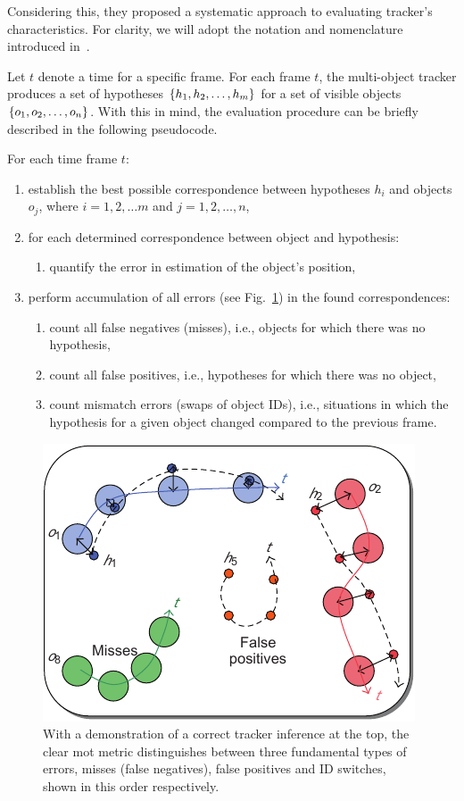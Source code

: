 Considering this, they proposed a systematic approach to evaluating tracker's characteristics. For clarity, we will adopt the notation and nomenclature introduced in~\cite{Bernardin2008}.

Let $t$ denote a time for a specific frame. For each frame $t$, the multi-object tracker produces a set of hypotheses $\left\{ {h_1, h_2, \dots, h_m} \right\}$ for a set of visible objects $\left\{ {o_1, o_2, \dots, o_n} \right\}$. With this in mind, the evaluation procedure can be briefly described in the following pseudocode.

For each time frame $t$:
\begin{enumerate}
    \item establish the best possible correspondence between hypotheses $h_i$ and objects $o_j$, where $i = 1, 2, \dots m$ and $j = 1, 2, \dots, n$,
    \item for each determined correspondence between object and hypothesis:
    \begin{enumerate}
        \item quantify the error in estimation of the object's position,
    \end{enumerate}
    \item perform accumulation of all errors (see Fig.~\ref{fig:CLEARHypotheses}) in the found correspondences:
    \begin{enumerate}
        \item count all false negatives (misses), i.e., objects for which there was no hypothesis,
        \item count all false positives, i.e., hypotheses for which there was no object,
        \item count mismatch errors (swaps of object IDs), i.e., situations in which the hypothesis for a given object changed compared to the previous frame.
    \end{enumerate}
\end{enumerate}


\begin{figure}[t]
    \centerline{\includegraphics[width=0.6\linewidth]{figures/theoretical_foundations/clear_hypotheses_status.pdf}}
    \caption[\gls{clear} hypotheses status]{With a demonstration of a correct tracker inference at the top, the \gls{clear} \gls{mot} metric distinguishes between three fundamental types of errors, misses (false negatives), false positives and ID switches, shown in this order respectively. }
    \label{fig:CLEARHypotheses}
\end{figure}
